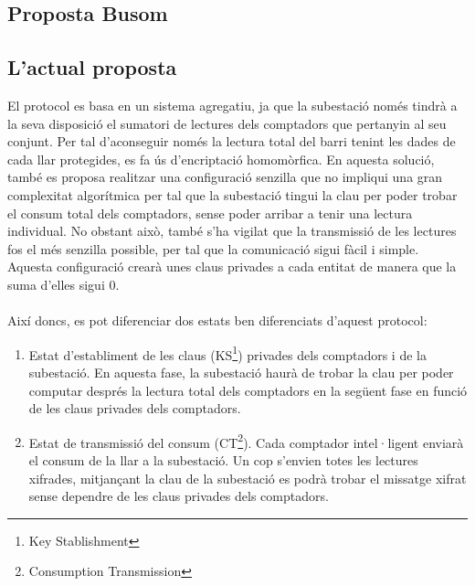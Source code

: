 \documentclass{article}
\begin{document}
\subsection{Proposta Busom}

\subsection{L'actual proposta}
El protocol \cite{recsi} es basa en un sistema agregatiu, ja que la subestació només tindrà a la seva disposició el sumatori de lectures dels comptadors que pertanyin al seu conjunt. Per tal d'aconseguir només la lectura total del barri tenint les dades de cada llar protegides, es fa ús d'encriptació homomòrfica.
En aquesta solució, també es proposa realitzar una configuració senzilla que no impliqui una gran complexitat algorítmica per tal que la subestació tingui la clau per poder trobar el consum total dels comptadors, sense poder arribar a tenir una lectura individual. No obstant això, també s'ha vigilat que la transmissió de les lectures fos el més senzilla possible, per tal que la comunicació sigui fàcil i simple. Aquesta configuració crearà unes claus privades a cada entitat de manera que la suma d'elles sigui 0. \\\\
Així doncs, es pot diferenciar dos estats ben diferenciats d'aquest protocol:
\begin{enumerate}
\item Estat d'establiment de les claus (KS\footnote{Key Stablishment}) privades dels comptadors i de la subestació. En aquesta fase, la subestació haurà de trobar la clau per poder computar després la lectura total dels comptadors en la següent fase en funció de les claus privades dels comptadors.
\item Estat de transmissió del consum (CT\footnote{Consumption Transmission}). Cada comptador intel·ligent enviarà el consum de la llar a la subestació. Un cop s'envien totes les lectures xifrades, mitjançant la clau de la subestació es podrà trobar el missatge xifrat sense dependre de les claus privades dels comptadors. 
\end{enumerate}
\end{document}
